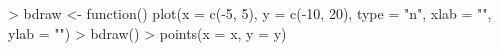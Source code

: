 \begin{Schunk}
\begin{Sinput}
> bdraw <- function() {
      plot(x = c(-5, 5), y = c(-10, 20), 
          type = "n", xlab = "", ylab = "")
  }
> bdraw()
> points(x = x, y = y)
\end{Sinput}
\end{Schunk}
